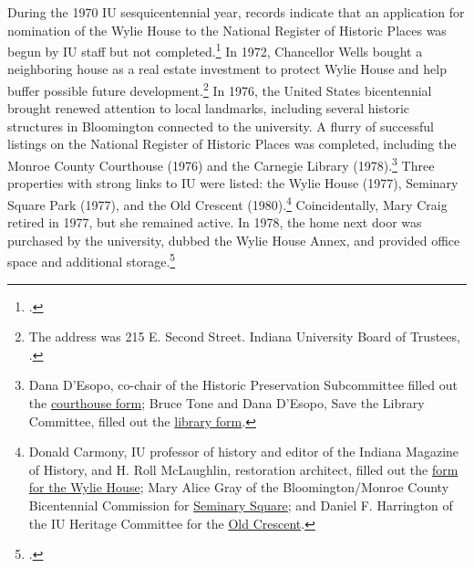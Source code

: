 \documentclass[
  american,
  letterpaper,
]{scrreprt}
\begin{document}
During the 1970 IU sesquicentennial year, records indicate that an
application for nomination of the Wylie House to the National Register
of Historic Places was begun by IU staff but not completed.\footnote{.}
In 1972, Chancellor Wells bought a neighboring house as a real estate
investment to protect Wylie House and help buffer possible future
development.\footnote{The address was 215 E. Second Street. Indiana
  University Board of Trustees, .}
In 1976, the United States bicentennial brought renewed attention to
local landmarks, including several historic structures in Bloomington
connected to the university. A flurry of successful listings on the
National Register of Historic Places was completed, including the Monroe
County Courthouse (1976) and the Carnegie Library (1978).\footnote{Dana
  D'Esopo, co-chair of the Historic Preservation Subcommittee filled out
  the
  \href{https://npgallery.nps.gov/NRHP/GetAsset/36d693e4-5c6b-4f6d-bed4-75e20051adc4}{courthouse
  form}; Bruce Tone and Dana D'Esopo, Save the Library Committee, filled
  out the
  \href{https://npgallery.nps.gov/NRHP/GetAsset/af4df484-de1d-40bf-9b65-ab846ed02b43}{library
  form}.} Three properties with strong links to IU were listed: the
Wylie House (1977), Seminary Square Park (1977), and the Old Crescent
(1980).\footnote{Donald Carmony, IU professor of history and editor of
  the Indiana Magazine of History, and H. Roll McLaughlin, restoration
  architect, filled out the
  \href{https://npgallery.nps.gov/NRHP/GetAsset/02688528-9112-4793-a0ec-9871bda0d52c}{form
  for the Wylie House}; Mary Alice Gray of the Bloomington/Monroe County
  Bicentennial Commission for
  \href{https://npgallery.nps.gov/NRHP/GetAsset/f7982d4d-3546-47c9-8afc-ae2cba1025eb}{Seminary
  Square}; and Daniel F. Harrington of the IU Heritage Committee for the
  \href{https://npgallery.nps.gov/NRHP/GetAsset/696439ba-d253-4034-a2c4-214caa9e038f}{Old
  Crescent}.} Coincidentally, Mary Craig retired in 1977, but she
remained active. In 1978, the home next door was purchased by the
university, dubbed the Wylie House Annex, and provided office space and
additional storage.\footnote{.}
\end{document}
